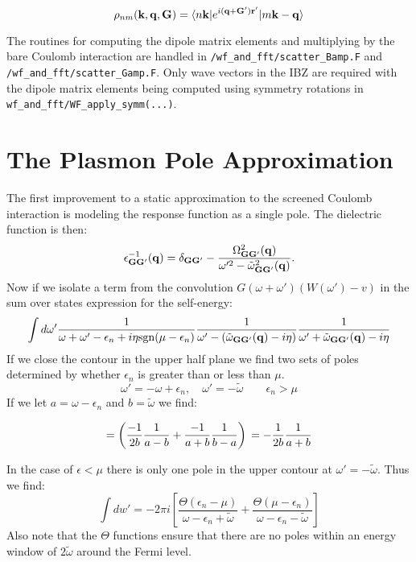 \documentclass{article}
\def\r{{\bf r}}
\def\k{{\bf k}}
\def\q{{\bf q}}
\def\G{{\bf G}}
\def\bra{\langle}
\def\ket{\rangle}
\begin{document}
\begin{equation}
\rho_{nm}(\k,\q,\G) =  \bra n\k|e^{i(\q+\G')\r'}|m\k-\q\ket
\end{equation}

The routines for computing the dipole matrix elements and multiplying 
by the bare Coulomb interaction
are handled in \verb;/wf_and_fft/scatter_Bamp.F; and \verb;/wf_and_fft/scatter_Gamp.F;.
Only wave vectors in the IBZ are required with the dipole 
matrix elements being computed using
symmetry rotations in \verb;wf_and_fft/WF_apply_symm(...);.

\section{The Plasmon Pole Approximation}
The first improvement to a static approximation to the screened Coulomb interaction
is modeling the response function as a single pole.
The dielectric function is then:
%
\begin{equation}
\epsilon^{-1}_{\G\G'}(\q) = \delta_{\G\G'}-\frac{\Omega^{2}_{\G\G'}(\q)}{\omega'^{2}-\tilde{\omega}^{2}_{\G\G'}(\q)}.
\end{equation}
%
Now if we isolate a term from the convolution $G(\omega+\omega')(W(\omega')-v)$ in 
the sum over states expression for the self-energy:
%
\begin{equation}
\int d\omega' \frac{1}{\omega+\omega'-\epsilon_{n}+i\eta{\rm sgn}(\mu-\epsilon_{n})}
\frac{1}{\omega'-(\tilde{\omega}_{\G\G'}(\q)-i\eta)}\frac{1}{\omega' + \tilde{\omega}_{\G\G'}(\q)-i\eta}
\end{equation}
%
If we close the contour in the upper half plane we find two sets of poles determined
by whether $\epsilon_{n}$ is greater than or less than $\mu$.
%
\begin{equation}
\omega' = -\omega +\epsilon_{n},\quad \omega' = -\tilde{\omega} \qquad \epsilon_{n} > \mu
\end{equation}
%
If we let $a=\omega-\epsilon_{n}$ and $b=\tilde{\omega}$ we find:

\begin{equation}
= \left( \frac{-1}{2b} \frac{1}{a-b} + \frac{-1}{a+b}\frac{1}{b-a}\right)\\
= -\frac{1}{2b}\frac{1}{a+b}
\end{equation}

In the case of $\epsilon<\mu$ there is only one pole in the upper contour
at $\omega' = - \tilde{\omega}$.
Thus we find:
%
\begin{equation}
\int dw' = -2\pi i \left[ \frac{\Theta(\epsilon_{n} - \mu)}{\omega - \epsilon_{n} + \tilde{\omega}} 
+\frac{\Theta(\mu - \epsilon_{n})}{\omega -\epsilon_{n} - \tilde{\omega}}\right]
\end{equation}
%
Also note that the $\Theta$ functions ensure that there are no 
poles within an energy window of $2\tilde{\omega}$ around 
the Fermi level.
\end{document}
